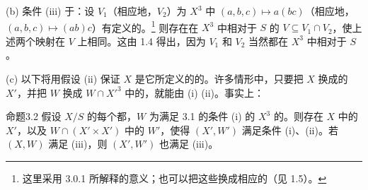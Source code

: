 (b) 条件 (iii) 于：设 $V_1$（相应地，$V_2$）为 $X^3$ 中 $(a,b,c)\mapsto a(bc)$（相应地，$(a,b,c)\mapsto(ab)c$）有定义的。\footnote{这里采用 3.0.1 所解释的意义；也可以把这些换成相应的（见 1.5）。} 则存在在 $X^3$ 中相对于 $S$ 的 $V\subseteq V_1\cap V_2$，使上述两个映射在 $V$ 上相同。这由 1.4 得出，因为 $V_1$ 和 $V_2$ 当然都在 $X^3$ 中相对于 $S$ 。

(c) 以下将用假设 (ii) 保证 $X$ 是它所定义的的。许多情形中，只要把 $X$ 换成的 $X'$，并把 $W$ 换成 $W\cap X'^3$ 中的，就能由 (i)  (ii)。事实上：
\begin{SGAresult}{命题}{3.2}
假设 $X/S$ 的每个都，$W$ 为满足 3.1 的条件 (i) 的 $X^3$ 的。则存在 $X$ 中的 $X'$，以及 $W\cap(X'\times X')$ 中的 $W'$，使得 $(X',W')$ 满足条件 (i)、(ii)。若 $(X,W)$ 满足 (iii)，则 $(X',W')$ 也满足 (iii)。
\end{SGAresult}
